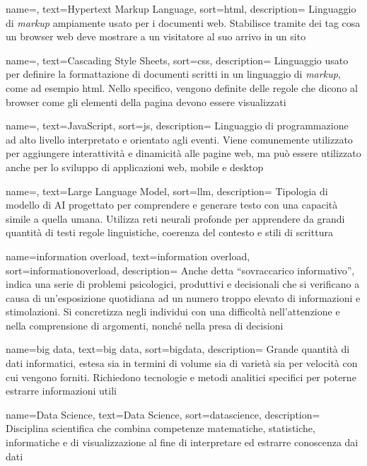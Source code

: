  {
    name=,
    text=Hypertext Markup Language,
    sort=html,
    description=
    {Linguaggio di \emph{markup} ampiamente usato per i documenti web.
    Stabilisce tramite dei tag cosa un browser web deve mostrare a un visitatore al suo arrivo in un sito}
}

 {
    name=,
    text=Cascading Style Sheets,
    sort=css,
    description=
    {Linguaggio usato per definire la formattazione di documenti scritti in un linguaggio di \emph{markup}, come ad esempio \gls{html}.
    Nello specifico, vengono definite delle regole che dicono al browser come gli elementi della pagina devono essere visualizzati}
}

 {
    name=,
    text=JavaScript,
    sort=js,
    description=
    {Linguaggio di programmazione ad alto livello interpretato e orientato agli eventi. Viene comunemente utilizzato per aggiungere interattività e dinamicità alle pagine web, 
    ma può essere utilizzato anche per lo sviluppo di applicazioni web, mobile e desktop}
}

 {
    name=,
    text=Large Language Model,
    sort=llm,
    description=
    {Tipologia di modello di AI progettato per comprendere e generare testo con una capacità simile a quella umana. 
    Utilizza reti neurali profonde per apprendere da grandi quantità di testi regole linguistiche, coerenza del contesto e stili di scrittura}
}

 {
    name=information overload,
    text=information overload,
    sort=informationoverload,
    description=
    {Anche detta ``sovraccarico informativo'', indica una serie di problemi psicologici, produttivi e decisionali che si verificano a causa di un'esposizione quotidiana 
    ad un numero troppo elevato di informazioni e stimolazioni.
    Si concretizza negli individui con una difficoltà nell'attenzione e nella comprensione di argomenti, nonché nella presa di decisioni}
}

 {
    name=big data,
    text=big data,
    sort=bigdata,
    description=
    {Grande quantità di dati informatici, estesa sia in termini di volume sia di varietà sia per velocità con cui vengono forniti. 
    Richiedono tecnologie e metodi analitici specifici per poterne estrarre informazioni utili}
}

 {
    name=Data Science,
    text=Data Science,
    sort=datascience,
    description=
    {Disciplina scientifica che combina competenze matematiche, statistiche, informatiche e di visualizzazione al fine di interpretare ed estrarre conoscenza dai dati}
}

